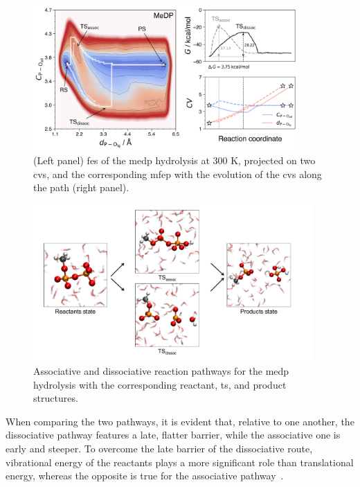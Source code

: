 \begin{figure}[ht]
    \centering
    \includegraphics[width=0.9\textwidth]{Figures/4_Results/results_MeDP_300K_fes_mfep.png}
    \caption{(Left panel) \ac{fes} of the \ac{medp} hydrolysis at 300 K, projected on two \acp{cv}, and the corresponding \ac{mfep} with the evolution of the \acp{cv} along the path (right panel).}
    \label{fig:medp_300k_fes_mfep}
\end{figure}

\begin{figure}[ht]
    \centering
    \includegraphics[width=0.95\textwidth]{Figures/4_Results/results_medp_mechanism.pdf}
    \caption{Associative and dissociative reaction pathways for the \ac{medp} hydrolysis with the corresponding reactant, \ac{ts}, and product structures.}
    \label{fig:medp_reaction_mechanism}
\end{figure}

When comparing the two pathways, it is evident that, relative to one another, the dissociative pathway features a late, flatter barrier, while the associative one is early and steeper. To overcome the late barrier of the dissociative route, vibrational energy of the reactants plays a more significant role than translational energy, whereas the opposite is true for the associative pathway~\citep{polanyiConceptsReactionDynamics1987}.

